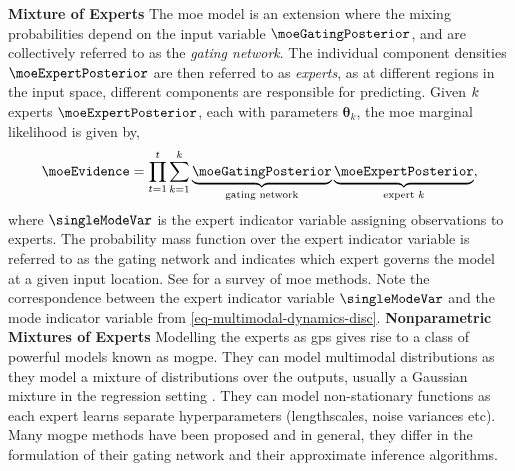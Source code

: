 \documentclass{mimosis-class/mimosis}
\numberwithin{equation}{chapter}
\newcommand{\numData}{\ensuremath{t}}
\newcommand{\modeInd}{\ensuremath{k}}
\newcommand{\NumData}{\ensuremath{\MakeUppercase{\numData}}}
\newcommand{\ModeInd}{\ensuremath{\MakeUppercase{\modeInd}}}
\newcommand{\mode}[1]{\ensuremath{#1_{\modeInd}}}
\newcommand{\latentFunc}{\ensuremath{f}}
\newcommand{\expertParamsK}{\ensuremath{\mode{\bm\theta}}}
\begin{document}
{\textbf{Mixture of Experts} The \acrfull{moe} model \citep{jacobsAdaptive1991} is
an extension where the mixing probabilities
depend on the input variable \(\moeGatingPosterior\), and are
collectively referred to as the \emph{gating network}.
The individual component densities \(\moeExpertPosterior\) are then referred to as \emph{experts},
as at different regions in the input space, different components are responsible for predicting.
Given \(\ModeInd\) experts \(\moeExpertPosterior\), each with parameters \(\expertParamsK\),
the \acrshort{moe} marginal likelihood is given by,
\begin{align} \label{eq-mixture-marginal-likelihood}
\moeEvidence = \prod_{\numData=1}^\NumData \sum_{\modeInd=1}^{\ModeInd}
\underbrace{\moeGatingPosterior}_{\text{gating network}}
\underbrace{\moeExpertPosterior}_{\text{expert } k},
\end{align}
where \(\singleModeVar\) is the expert indicator variable assigning observations to experts.
The probability mass function over the expert indicator variable is referred to as the gating network and
indicates which expert governs the model at a given input location.
See \cite{yukselTwenty2012} for a survey of \acrshort{moe} methods.
Note the correspondence between the expert indicator variable \(\singleModeVar\)
and the mode indicator variable from \cref{eq-multimodal-dynamics-disc}.
\newline
\textbf{Nonparametric Mixtures of Experts}
Modelling the experts as \acrshort{gps} gives rise to a class of powerful models known as \acrfull{mogpe}.
They can model multimodal distributions as they model a mixture of distributions
over the outputs, usually a Gaussian mixture in the regression setting \citep{trespMixtures2000a,rasmussenInfinite2001}.
They can model non-stationary functions as
each expert learns separate hyperparameters (lengthscales, noise variances etc).
Many \acrshort{mogpe} methods have been proposed and in general, they differ in
the formulation of their gating network and their approximate inference algorithms.

\begin{figure}[t]
  \centering
    \begin{minipage}[r]{0.49\textwidth}
\end{minipage}
\end{figure}}
\end{document}
